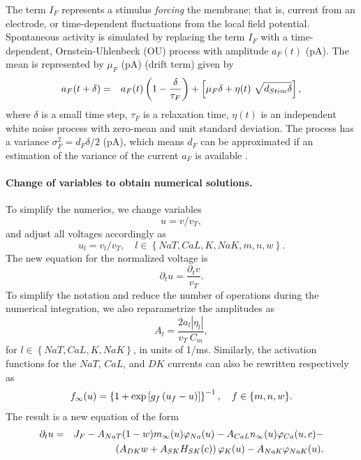 \documentclass[12pt]{article}
\begin{document}
The term $I_{F}$ represents a stimulus \textit{forcing} the membrane; that is, current from an electrode, or time-dependent fluctuations from the local field potential. 
Spontaneous activity is simulated by replacing the term $I_{F}$ with a  time-dependent, Ornstein-Uhlenbeck (OU) process with amplitude $a_{F}(t)$ (pA). The mean is represented by  $\mu_{F}$ (pA) (drift term)
\citep{rudolph2003characterization}  given by \citep{gillespie1996mathematics,
  gillespie1996exact} 
\begin{eqnarray}
{a}_{F}(t+\delta) &=& a_{F}(t) \left(1 -  \frac{\delta}{\tau_{F}}\right)  +
\left[ \mu_{F} \delta + \eta(t) ~\sqrt{d_{Stim} \delta}\right],
\label{eq:OU}
\end{eqnarray}
where $\delta$ is a small time step, $\tau_{F}$ is a relaxation time,  $\eta(t)$ is an independent
white noise process with zero-mean and unit standard deviation. The process has a variance
$\sigma_{F}^2 = d_{F} \delta /2$ (pA), which means $d_{F}$ can be
approximated if an estimation of the variance of the current $a_{F}$ is
available \citep{rudolph2004method,destexhe2004novel}.  

\paragraph{Change of variables to obtain numerical solutions.}
To simplify the numerics, we change variables $$u = v/v_T,$$ and adjust all voltages accordingly as $$u_l = v_l/v_T, \quad l \in \left\{NaT,CaL,K,NaK,m,n,w \right\}.$$ 
The new equation for the normalized voltage is $$\partial_t u = \frac{\partial_t v}{v_T}.$$
To simplify the notation and reduce the number of operations during the numerical integration, we also reparametrize the amplitudes as 
\begin{equation}A_l = \frac{2 a_l |\eta_l|}{v_T~C_m}, \label{eq:normA}
\end{equation} 
for $l \in \left\{NaT,CaL,K,NaK \right\}$, in units of 1/ms. 
Similarly,
the activation functions for the $NaT$, $CaL$, and $DK$ currents can also be rewritten respectively
as 
\begin{equation}
f_{\infty}(u) = \left\{1 + \exp\left[g_f \left(u_f-u \right) \right]\right\}^{-1}, \quad{f \in  \left\{m,n,w \right\}}.
\end{equation}
The result is a new equation of the form
\begin{eqnarray}
\partial_t u &=& J_F -A_{NaT}(1-w)m_{\infty}(u) \varphi_{Na}(u) - A_{CaL}n_{\infty}(u) \varphi_{Ca}(u,c)- \notag \\
&& \left(A_{DK}w + A_{SK}H_{SK}(c)\right)\varphi_{K}(u)- A_{NaK}\varphi_{NaK}(u
).
\end{eqnarray}
 
\end{document}
